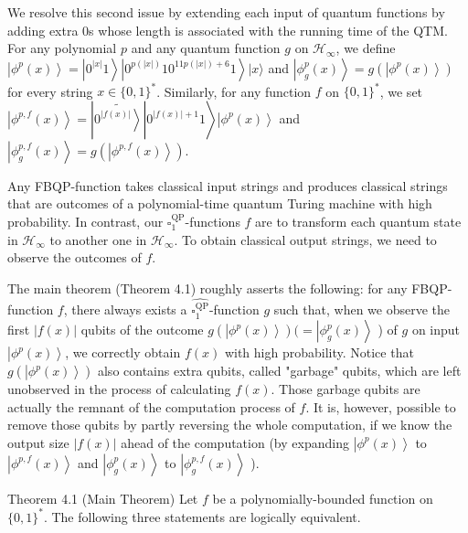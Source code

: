 \documentclass[10pt]{article}
\begin{document}
We resolve this second issue by extending each input of quantum functions by adding extra 0s whose length is associated with the running time of the QTM. For any polynomial $p$ and any quantum function $g$ on $\mathcal{H}_{\infty}$, we define $\left|\phi^{p}(x)\right\rangle=\left|0^{|x|} 1\right\rangle\left|0^{p(|x|)} 10^{11 p(|x|)+6} 1\right\rangle|x\rangle$ and $\left|\phi_{g}^{p}(x)\right\rangle=g\left(\left|\phi^{p}(x)\right\rangle\right)$ for every string $x \in\{0,1\}^{*}$. Similarly, for any function $f$ on $\{0,1\}^{*}$, we set $\left.\left|\phi^{p, f}(x)\right\rangle=\left|\widetilde{\left.0^{|f(x)|}\right\rangle}\right| 0^{|f(x)|+1} 1\right\rangle\left|\phi^{p}(x)\right\rangle$ and $\left|\phi_{g}^{p, f}(x)\right\rangle=g\left(\left|\phi^{p, f}(x)\right\rangle\right)$.

Any FBQP-function takes classical input strings and produces classical strings that are outcomes of a polynomial-time quantum Turing machine with high probability. In contrast, our $\square_{1}^{\mathrm{QP}}$-functions $f$ are to transform each quantum state in $\mathcal{H}_{\infty}$ to another one in $\mathcal{H}_{\infty}$. To obtain classical output strings, we need to observe the outcomes of $f$.

The main theorem (Theorem 4.1) roughly asserts the following: for any FBQP-function $f$, there always exists a $\widehat{\square_{1}^{\mathrm{QP}}}$-function $g$ such that, when we observe the first $|f(x)|$ qubits of the outcome $g\left(\left|\phi^{p}(x)\right\rangle\right)(= \left|\phi_{g}^{p}(x)\right\rangle$ ) of $g$ on input $\left|\phi^{p}(x)\right\rangle$, we correctly obtain $f(x)$ with high probability. Notice that $g\left(\left|\phi^{p}(x)\right\rangle\right)$ also contains extra qubits, called "garbage" qubits, which are left unobserved in the process of calculating $f(x)$. Those garbage qubits are actually the remnant of the computation process of $f$. It is, however, possible to remove those qubits by partly reversing the whole computation, if we know the output size $|f(x)|$ ahead of the computation (by expanding $\left|\phi^{p}(x)\right\rangle$ to $\left|\phi^{p, f}(x)\right\rangle$ and $\left|\phi_{g}^{p}(x)\right\rangle$ to $\left|\phi_{g}^{p, f}(x)\right\rangle$ ).

Theorem 4.1 (Main Theorem) Let $f$ be a polynomially-bounded function on $\{0,1\}^{*}$. The following three statements are logically equivalent.
\end{document}
